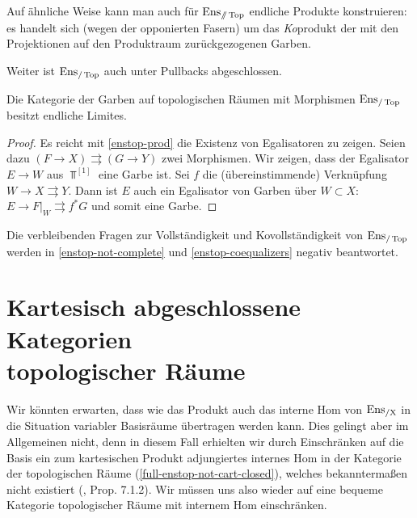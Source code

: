 \begin{bem}
  Auf ähnliche Weise kann man auch für $\operatorname{Ens}_{\mathbin{/\mkern-6mu/} \operatorname{Top}}$ endliche
  Produkte konstruieren: es handelt sich (wegen der opponierten
  Fasern) um das \emph{Ko}produkt der mit den Projektionen auf den
  Produktraum zurückgezogenen Garben.
\end{bem}
Weiter ist $\operatorname{Ens}_{/\operatorname{Top}}$ auch unter Pullbacks abgeschlossen.
\begin{satz} \label{enstop-fin-complete}
  Die Kategorie der Garben auf topologischen Räumen mit Morphismen
  $\operatorname{Ens}_{/\operatorname{Top}}$ besitzt endliche Limites.
\end{satz}
\begin{proof}
  Es reicht mit \ref{enstop-prod} die Existenz von Egalisatoren zu
  zeigen. Seien dazu $(F \to X) \rightrightarrows (G \to Y)$ zwei
  Morphismen. Wir zeigen, dass der Egalisator $E \to W$ aus
  $\Top^{[1]}$ eine Garbe ist. Sei $f$ die (übereinstimmende)
  Verknüpfung $W \to X \rightrightarrows Y$. Dann ist $E$ auch ein
  Egalisator von Garben über $W \subset X$: $E \to F|_W
  \rightrightarrows f^* G$ und somit eine Garbe.
\end{proof}
\begin{bem}
  Die verbleibenden Fragen zur Vollständigkeit und Kovollständigkeit
  von $\operatorname{Ens}_{/\operatorname{Top}}$ werden in \ref{enstop-not-complete} und
  \ref{enstop-coequalizers} negativ beantwortet.
\end{bem}

\section[Kartesisch abgeschlossene Kategorien topologischer Räume]
        {\texorpdfstring
          {Kartesisch abgeschlossene Kategorien\\ topologischer Räume}
          {Kartesisch abgeschlossene Kategorien topologischer Räume}
          }

Wir könnten erwarten, dass wie das Produkt auch das interne Hom von
$\operatorname{Ens_{/X}}$ in die Situation variabler Basisräume übertragen werden
kann. Dies gelingt aber im Allgemeinen nicht, denn in diesem Fall
erhielten wir durch Einschränken auf die Basis ein zum kartesischen
Produkt adjungiertes internes Hom in der Kategorie der topologischen
Räume (\ref{full-enstop-not-cart-closed}), welches bekanntermaßen
nicht existiert (\cite{Borceux}, Prop. 7.1.2). Wir müssen uns also
wieder auf eine bequeme Kategorie topologischer Räume mit internem Hom
einschränken.


